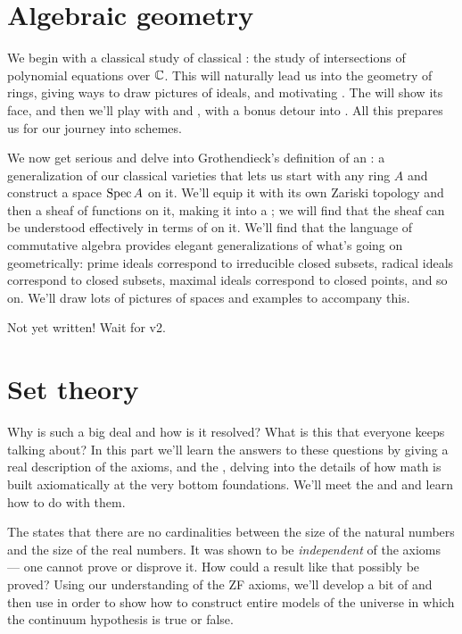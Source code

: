 \section{Algebraic geometry}
\begin{itemize}
We begin with a classical study of classical :
the study of intersections of polynomial equations over $\mathbb C$.
This will naturally lead us into the geometry of rings,
giving ways to draw pictures of ideals,
and motivating .
The  will show its face,
and then we'll play with 
and ,
with a bonus detour into .
All this prepares us for our journey into schemes.

We now get serious and delve into Grothendieck's definition of
an :
a generalization of our classical varieties
that lets us start with any ring $A$
and construct a space $\operatorname{Spec} A$ on it.
We'll equip it with its own Zariski topology
and then a sheaf of functions on it,
making it into a ;
we will find that the sheaf can be understood
effectively in terms of  on it.
We'll find that the language of commutative algebra provides
elegant generalizations of what's going on geometrically:
prime ideals correspond to irreducible closed subsets,
radical ideals correspond to closed subsets,
maximal ideals correspond to closed points, and so on.
We'll draw lots of pictures of spaces and examples to accompany this.

Not yet written! Wait for v2.
\end{itemize}

\section{Set theory}
\begin{itemize}
Why is  such a big deal
and how is it resolved?
What is this 
that everyone keeps talking about?
In this part we'll learn the answers to these questions
by giving a real description of the 
axioms, and the ,
delving into the details of how math is built axiomatically
at the very bottom foundations.
We'll meet the  and 
and learn how to do  with them.

The 
states that there are no cardinalities
between the size of the natural numbers and the size of the real numbers.
It was shown to be \emph{independent} of the axioms ---
one cannot prove or disprove it.
How could a result like that possibly be proved?
Using our understanding of the ZF axioms,
we'll develop a bit of 
and then use  in order to show
how to construct entire models of the universe
in which the continuum hypothesis is true or false.
\end{itemize}
